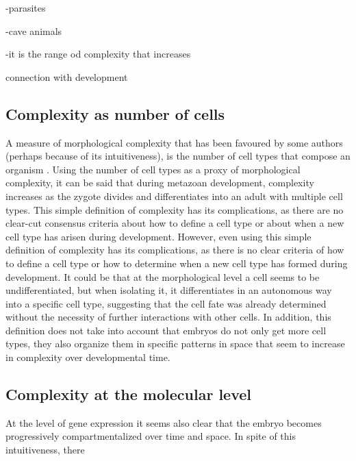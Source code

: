 -parasites

-cave animals

-it is the range od complexity that increases


connection with development


	
\subsection{Complexity as number of cells}

A measure of morphological complexity that has been favoured by some authors (perhaps because of its intuitiveness), is the number of cell types that compose an organism 
	\citep{Bell1997,Bonner2004,McShea1996}.
Using the number of cell types as a proxy of morphological complexity, it can be said that during metazoan development, complexity increases as the zygote divides and differentiates into an adult with multiple cell types. This simple definition of complexity has its complications, as there are no clear-cut consensus criteria about how to define a cell type or about when a new cell type has arisen during development. 
However, even using this simple definition of complexity has its complications, as there is no clear criteria of how to define a cell type or how to determine when a new cell type has formed during development. It could be that at the morphological level a cell seems to be undifferentiated, but when isolating it, it differentiates in an autonomous way into a specific cell type, suggesting that the cell fate was already determined without the necessity of further interactions with other cells. 
In addition, this definition does not take into account that embryos do not only get more cell types, they also organize them in specific patterns in space that seem to increase in complexity over developmental time.

	
\subsection{Complexity at the molecular level}


At the level of gene expression it seems also clear that the embryo becomes progressively compartmentalized over time and space. In spite of this intuitiveness, there
